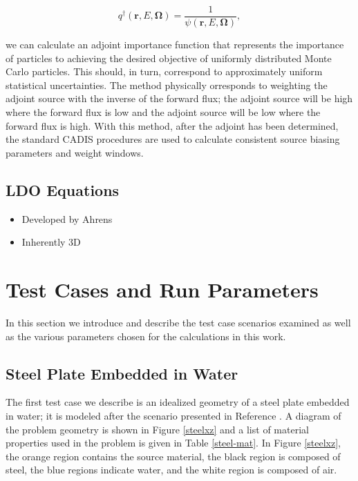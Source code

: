 \documentclass{article} %
\newcommand{\bo}{\mathbf\Omega}
\newcommand{\vecr}{\textbf{r}}
\begin{document}
\begin{equation}
q^{\dagger}(\vecr,E,\bo) = \frac{1}{\psi(\vecr,E,\bo)},
\end{equation}

\noindent we can calculate an adjoint importance function that represents the
importance of particles to achieving the desired objective of uniformly
distributed Monte Carlo particles. This should, in turn, correspond to
approximately uniform statistical uncertainties. The method physically 
orresponds to weighting the adjoint source with the inverse of the forward
flux; the adjoint source will be high where the forward flux is low and the
adjoint source will be low where the forward flux is high. With this method,
after the adjoint has been determined, the standard CADIS procedures are used
to calculate consistent source biasing parameters and weight windows.

\subsection{LDO Equations}

\begin{itemize}
\item{Developed by Ahrens}
\item{Inherently 3D}
\end{itemize}

\section{Test Cases and Run Parameters}

In this section we introduce and describe the test case scenarios examined as
well as the various parameters chosen for the calculations in this work. 

\subsection{Steel Plate Embedded in Water}
\label{sec:steel_params}

The first test case we describe is an idealized geometry of a steel plate 
embedded in water; it is modeled after the scenario presented in Reference 
\cite{wilsonslaybaugh}. 
A diagram of the problem geometry is shown in Figure \ref{steelxz} and a list
of material properties used in the problem is given in Table \ref{steel-mat}.
In Figure \ref{steelxz}, the orange region contains the source material, the 
black region is composed of steel, the blue regions indicate water, and the 
white region is composed of air.
\end{document}
